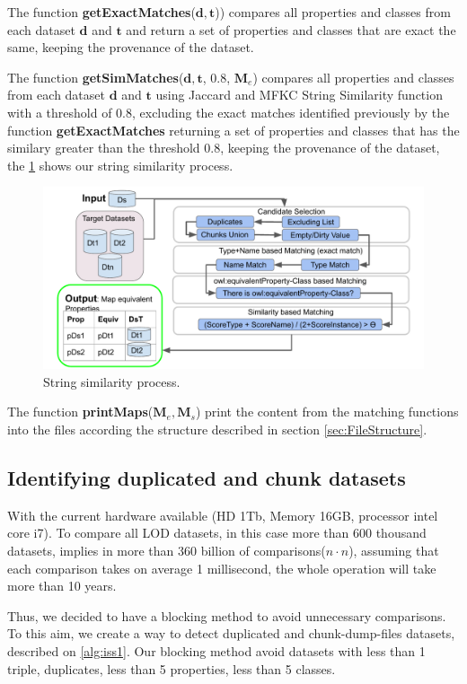 \documentclass[sw]{iosart2x}
\begin{document}
The function \textbf{getExactMatches}($\mathbf{d},\mathbf{t}$)) compares all properties and classes from each dataset $\mathbf{d}$ and $\mathbf{t}$ and return a set of properties and classes that are exact the same, keeping the provenance of the dataset.

The function \textbf{getSimMatches}($\mathbf{d},\mathbf{t}$, 0.8, $\mathbf{M}_e$) compares all properties and classes from each dataset $\mathbf{d}$ and $\mathbf{t}$ using Jaccard and MFKC\cite{valdestilhas2017high} String Similarity function with a threshold of 0.8, excluding the exact matches identified previously by the function \textbf{getExactMatches} returning a set of properties and classes that has the similary greater than the threshold 0.8, keeping the provenance of the dataset, the \cref{fig:simMatch} shows our string similarity process.
\begin{figure}[htb] 
	\centering
	\includegraphics[width=0.8\linewidth]{img/stringSim.pdf}
	\caption{String similarity process.}
	\label{fig:simMatch}
\end{figure}

The function \textbf{printMaps}($\mathbf{M}_e, \mathbf{M}_s$) print the content from the matching functions into the files according the structure described in section \ref{sec:FileStructure}.

\subsection{Identifying duplicated and chunk datasets}
\label{sec:duplicates}
With the current hardware available (HD 1Tb, Memory 16GB, processor intel core i7).
To compare all LOD datasets, in this case more than 600 thousand datasets, implies in more than 360 billion of comparisons($n \cdot n$), assuming that each comparison takes on average 1 millisecond, the whole operation will take more than 10 years.

Thus, we decided to have a blocking method to avoid unnecessary comparisons. To this aim, we create a way to detect duplicated and chunk-dump-files datasets, described on \cref{alg:iss1}. 
Our blocking method avoid datasets with less than 1 triple, duplicates, less than 5 properties, less than 5 classes.
\end{document}
